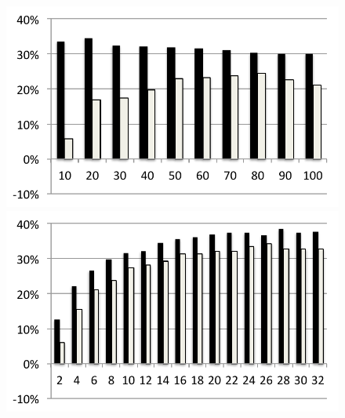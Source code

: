 \begin{figure}
  \includegraphics[width=\mywidth]{../../eval/32threads/case4it.pdf}\includegraphics[width=\mywidth]{../../eval/32threads/case4th.pdf}
\end{figure}




\vfill
